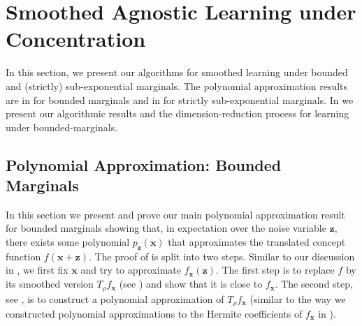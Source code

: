 \documentclass{theoretics}
\renewcommand\vec[1]{\mathbf{#1}}
\newcommand{\1}{\Ind}
\newcommand{\x}{\vec x}
\newcommand{\z}{\vec z}
\begin{document}
\section{Smoothed Agnostic Learning under Concentration}
\label{sec:3}
In this section, we present our algorithms for smoothed learning under bounded 
and (strictly) sub-exponential marginals. The polynomial approximation results are in  for bounded marginals and in  for strictly sub-exponential marginals. In 
 we present our algorithmic results and the dimension-reduction process for learning under bounded-marginals.

\subsection{Polynomial Approximation: Bounded Marginals}
\label{subsec:3.1}

In this section we present and prove our main polynomial approximation
result for bounded marginals showing that, in expectation over the noise variable $\vec z$,
there exists some polynomial $p_{\vec z}(\x)$ that approximates the
translated concept function $f(\vec x + \vec z)$.  The proof of 
is split into two steps. 
Similar to our discussion in , we first fix $\x$ and try to approximate $f_{\x}(\z)$.
The first step is to replace $f$ by its smoothed version $T_\rho f_{\x}$ (see ) and 
show that it is close to $f_{\x}$. 
The second step, see , 
is to construct a polynomial approximation of $T_\rho f_{\x}$ (similar to the way we constructed polynomial approximations to the Hermite coefficients of $f_\x$ in ).
\end{document}
